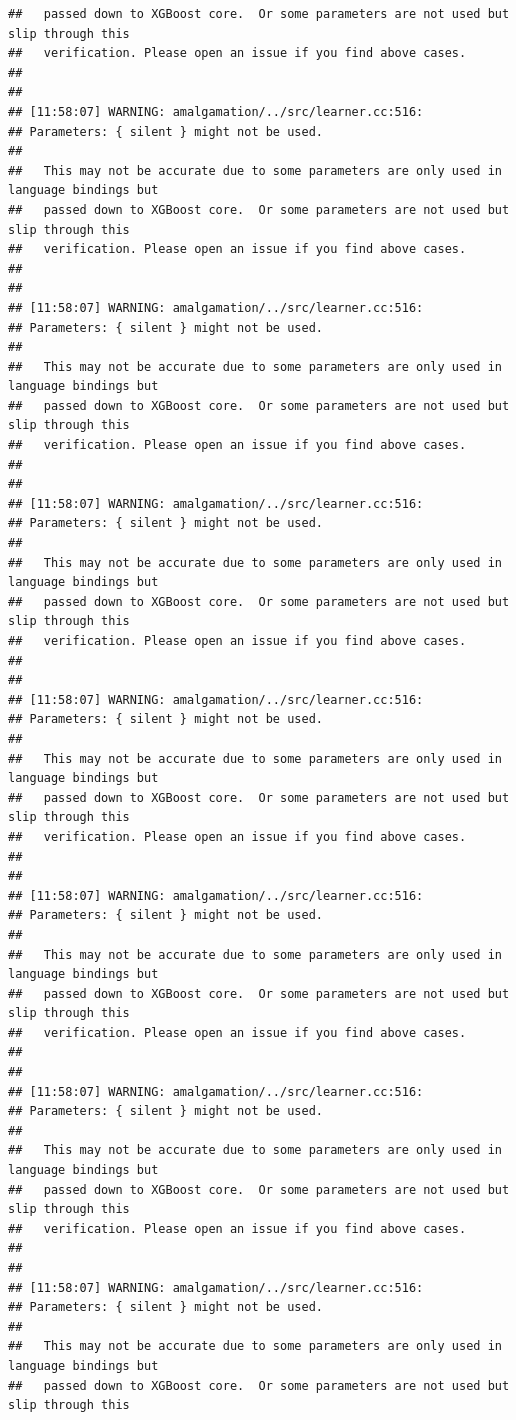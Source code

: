 \documentclass[AMS,STIX2COL]{WileyNJD-v2}\usepackage[]{graphicx}\usepackage[]{color}
\makeatletter
\newenvironment{kframe}{%
 \def\at@end@of@kframe{}%
 \ifinner\ifhmode%
  \def\at@end@of@kframe{\end{minipage}}%
  \begin{minipage}{\columnwidth}%
 \fi\fi%
 \def\FrameCommand##1{\hskip\@totalleftmargin \hskip-\fboxsep
 \colorbox{shadecolor}{##1}\hskip-\fboxsep
     \hskip-\linewidth \hskip-\@totalleftmargin \hskip\columnwidth}%
 \MakeFramed {\advance\hsize-\width
   \@totalleftmargin\z@ \linewidth\hsize
   \@setminipage}}%
 {\par\unskip\endMakeFramed%
 \at@end@of@kframe}
\newenvironment{knitrout}{}{} %
\makeatother
\begin{document}
\begin{knitrout}
\begin{kframe}
\begin{verbatim}
##   passed down to XGBoost core.  Or some parameters are not used but slip through this
##   verification. Please open an issue if you find above cases.
## 
## 
## [11:58:07] WARNING: amalgamation/../src/learner.cc:516: 
## Parameters: { silent } might not be used.
## 
##   This may not be accurate due to some parameters are only used in language bindings but
##   passed down to XGBoost core.  Or some parameters are not used but slip through this
##   verification. Please open an issue if you find above cases.
## 
## 
## [11:58:07] WARNING: amalgamation/../src/learner.cc:516: 
## Parameters: { silent } might not be used.
## 
##   This may not be accurate due to some parameters are only used in language bindings but
##   passed down to XGBoost core.  Or some parameters are not used but slip through this
##   verification. Please open an issue if you find above cases.
## 
## 
## [11:58:07] WARNING: amalgamation/../src/learner.cc:516: 
## Parameters: { silent } might not be used.
## 
##   This may not be accurate due to some parameters are only used in language bindings but
##   passed down to XGBoost core.  Or some parameters are not used but slip through this
##   verification. Please open an issue if you find above cases.
## 
## 
## [11:58:07] WARNING: amalgamation/../src/learner.cc:516: 
## Parameters: { silent } might not be used.
## 
##   This may not be accurate due to some parameters are only used in language bindings but
##   passed down to XGBoost core.  Or some parameters are not used but slip through this
##   verification. Please open an issue if you find above cases.
## 
## 
## [11:58:07] WARNING: amalgamation/../src/learner.cc:516: 
## Parameters: { silent } might not be used.
## 
##   This may not be accurate due to some parameters are only used in language bindings but
##   passed down to XGBoost core.  Or some parameters are not used but slip through this
##   verification. Please open an issue if you find above cases.
## 
## 
## [11:58:07] WARNING: amalgamation/../src/learner.cc:516: 
## Parameters: { silent } might not be used.
## 
##   This may not be accurate due to some parameters are only used in language bindings but
##   passed down to XGBoost core.  Or some parameters are not used but slip through this
##   verification. Please open an issue if you find above cases.
## 
## 
## [11:58:07] WARNING: amalgamation/../src/learner.cc:516: 
## Parameters: { silent } might not be used.
## 
##   This may not be accurate due to some parameters are only used in language bindings but
##   passed down to XGBoost core.  Or some parameters are not used but slip through this

\end{verbatim}
\end{kframe}
\end{knitrout}
\end{document}
